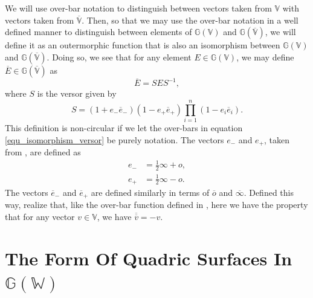 \documentclass{birkjour}
\theoremstyle{definition}
\theoremstyle{remark}
\numberwithin{equation}{section}
\newcommand{\G}{\mathbb{G}}
\newcommand{\V}{\mathbb{V}}
\newcommand{\Vb}{\mathbb{\overline{V}}}
\newcommand{\W}{\mathbb{W}}
\newcommand{\nvao}{o}
\newcommand{\nvai}{\infty}
\newcommand{\nvaob}{\overline{o}}
\newcommand{\nvaib}{\overline{\infty}}
\newcommand{\eminus}{e_{-}}
\newcommand{\eplus}{e_{+}}
\newcommand{\eminusb}{\overline{e}_{-}}
\newcommand{\eplusb}{\overline{e}_{+}}
\begin{document}
We will use over-bar notation to distinguish between vectors taken from $\V$
with vectors taken from $\Vb$.  Then, so that we may use the over-bar notation
in a well defined manner to distinguish between elements of $\G(\V)$ and $\G(\Vb)$,
we will define it as an outermorphic function that is also an isomorphism between
$\G(\V)$ and $\G(\Vb)$.  Doing so, we see that for any element $E\in\G(\V)$,
we may define $\overline{E}\in\G(\Vb)$ as
\begin{equation}
\overline{E} = SES^{-1},
\end{equation}
where $S$ is the versor given by
\begin{equation}\label{equ_isomorphism_versor}
S = (1+\eminus\eminusb)(1-\eplus\eplusb)\prod_{i=1}^n(1-e_i\overline{e}_i).
\end{equation}
This definition is non-circular if we let the over-bars in equation \eqref{equ_isomorphism_versor}
be purely notation.  The vectors $\eminus$ and $\eplus$, taken from \cite{LiRockwood},
are defined as
\begin{align}
\eminus &= \frac{1}{2}\nvai + \nvao, \\
\eplus &= \frac{1}{2}\nvai - \nvao.
\end{align}
The vectors $\eminusb$ and $\eplusb$ are defined similarly in terms of $\nvaob$ and $\nvaib$.
Defined this way, realize that, like the over-bar function defined in \cite{Parkin12},
here we have the property that for any vector $v\in\V$, we have $\overline{\overline{v}}=-v$.

\section{The Form Of Quadric Surfaces In $\G(\W)$}
\end{document}
